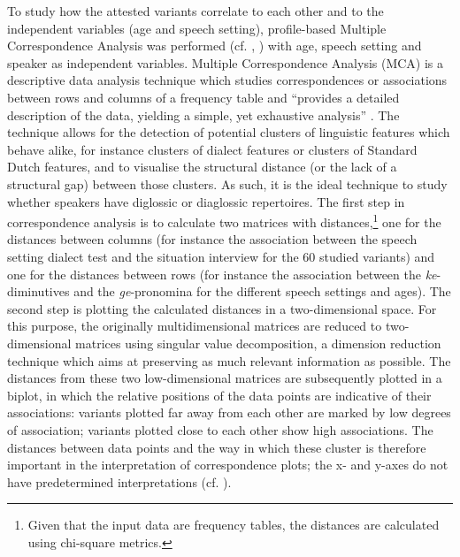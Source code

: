 \documentclass[output=paper]{LSP/langsci}
\begin{document}
\clearpage
To study how the attested variants correlate to each other and to the independent variables (age and speech setting), profile-based Multiple Correspondence Analysis was performed (cf. \citealt{de_sutter_lexical_2012}, \citealt{plevoets_tussen_2008}) with age, speech setting and speaker as independent variables. Multiple Correspondence Analysis (MCA) is a descriptive data analysis technique which studies correspondences or associations between rows and columns of a frequency table and “provides a detailed description of the data, yielding a simple, yet exhaustive analysis” \citep[1]{costa_use_2013}. The technique allows for the detection of potential clusters of linguistic features which behave alike, for instance clusters of dialect features or clusters of Standard Dutch features, and to visualise the structural distance (or the lack of a structural gap) between those clusters. As such, it is the ideal technique to study whether speakers have diglossic or diaglossic repertoires. The first step in correspondence analysis is to calculate two matrices with distances,\footnote{ Given that the input data are frequency tables, the distances are calculated using chi-square metrics.} one for the distances between columns (for instance the association between the speech setting dialect test and the situation interview for the 60 studied variants) and one for the distances between rows (for instance the association between the \textit{ke}-diminutives and the \textit{ge}-pronomina for the different speech settings and ages). The second step is plotting the calculated distances in a two-dimensional space. For this purpose, the originally multidimensional matrices are reduced to two-dimensional matrices using singular value decomposition, a dimension reduction technique which aims at preserving as much relevant information as possible. The distances from these two low-dimensional matrices are subsequently plotted in a biplot, in which the relative positions of the data points are indicative of their associations: variants plotted far away from each other are marked by low degrees of association; variants plotted close to each other show high associations. The distances between data points and the way in which these cluster is therefore important in the interpretation of correspondence plots; the x- and y-axes do not have predetermined interpretations (cf. \citealt{geeraerts_schmidt_2010}). 
\end{document}
